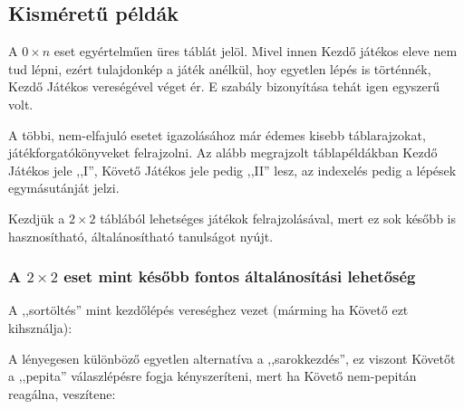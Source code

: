 \documentclass{article}
\newcommand{\anz}[1]{$\mathrm{I}_{#1}$}
\newcommand{\nch}[1]{$\mathrm{II}_{#1}$}
\begin{document}
		\subsection{Kisméretű példák}

			A $0\times n$ eset egyértelműen üres táblát jelöl. Mivel innen Kezdő játékos eleve nem tud lépni, ezért tulajdonkép a játék anélkül, hoy egyetlen lépés is történnék, Kezdő Játékos vereségével véget ér. E szabály bizonyítása tehát igen egyszerű volt.

			A többi, nem-elfajuló esetet igazolásához már édemes kisebb táblarajzokat, játékforgatókönyveket felrajzolni.
			Az alább megrajzolt táblapéldákban Kezdő Játékos jele ,,I'', Követő Játékos jele pedig ,,II'' lesz, az indexelés pedig a lépések egymásutánját jelzi.

			Kezdjük a $2\times2$ táblából lehetséges játékok felrajzolásával, mert ez sok később is hasznosítható, általánosítható tanulságot nyújt.

			\subsubsection{A $2\times2$ eset mint később fontos általánosítási lehetőség}
				A ,,sortöltés'' mint kezdőlépés vereséghez vezet (márming ha Követő ezt kihsználja):\\
				A lényegesen különböző egyetlen alternatíva a ,,sarokkezdés'', ez viszont Követőt a ,,pepita'' válaszlépésre fogja kényszeríteni, mert ha Követő nem-pepitán reagálna, veszítene:\\
\end{document}

